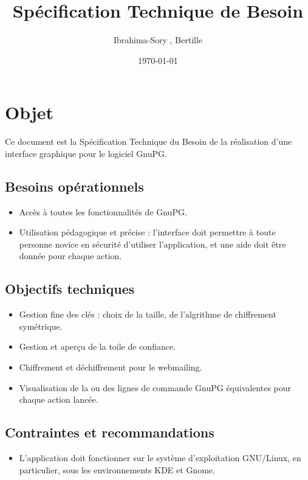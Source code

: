 \documentclass{../res/univ-projet}
\title{Spécification Technique de Besoin}
\author{Ibrahima-Sory \bsc{Barry}, Bertille \bsc{Bouillie}}
\date{\today}
\begin{document}
\maketitle
\newpage
\tableofcontents
\newpage

\section{Objet}

Ce document est la Spécification Technique du Besoin de la réalisation d'une interface graphique pour le logiciel GnuPG.

\subsection{Besoins opérationnels}
\begin{itemize}
 \item Accès à toutes les fonctionnalités de GnuPG.
 \item Utilisation pédagogique et précise : l'interface doit permettre à toute personne novice en sécurité d'utiliser l'application, et une aide doit être donnée pour chaque action.
\end{itemize}

\subsection{Objectifs techniques}
\begin{itemize}
 \item Gestion fine des clés : choix de la taille, de l'algrithme de chiffrement symétrique.
 \item Gestion et aperçu de la toile de confiance.
 \item Chiffrement et déchiffrement pour le webmailing.
 \item Visualisation de la ou des lignes de commande GnuPG équivalentes pour chaque action lancée.
\end{itemize}

\subsection{Contraintes et recommandations}
\begin{itemize}
 \item L'application doit fonctionner sur le système d'exploitation GNU/Linux, en particulier, sous les environnements KDE et Gnome.
\end{itemize}
\end{document}
